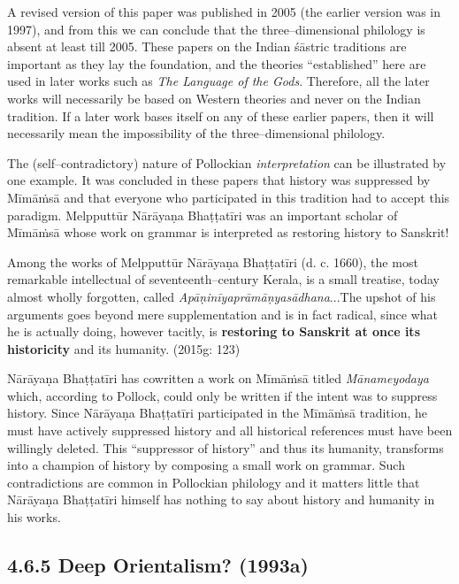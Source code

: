 A revised version of this paper was published in 2005 (the earlier version was in 1997), and from this we can conclude that the three–dimensional philology is absent at least till 2005. These papers on the Indian śāstric traditions are important as they lay the foundation, and the theories “established” here are used in later works such as \textit{The Language of the Gods}. Therefore, all the later works will necessarily be based on Western theories and never on the Indian tradition. If a later work bases itself on any of these earlier papers, then it will necessarily mean the impossibility of the three–dimensional philology.

The (self–contradictory) nature of Pollockian \textit{interpretation} can be illustrated by one example. It was concluded in these papers that history was suppressed by Mīmāṁsā and that everyone who participated in this tradition had to accept this paradigm. Melpputtūr Nārāyaṇa Bhaṭṭatīri was an important scholar of Mīmāṁsā whose work on grammar is interpreted as restoring history to Sanskrit!

\begin{myquote}
Among the works of Melpputtūr Nārāyaṇa Bhaṭṭatīri (d. c. 1660), the most remarkable intellectual of seventeenth–century Kerala, is a small treatise, today almost wholly forgotten, called \textit{Apāṇinīyaprāmāṇyasādhana}\-...The upshot of his arguments goes beyond mere supplementation and is in fact radical, since what he is actually doing, however tacitly, is \textbf{restoring to Sanskrit at once its historicity} and its humanity. (2015g: 123)
\end{myquote}

Nārāyaṇa Bhaṭṭatīri has cowritten a work on Mīmāṁsā	titled \textit{Mānameyodaya }which, according to Pollock, could only be written if the intent was to suppress history. Since Nārāyaṇa Bhaṭṭatīri participated in the Mīmāṁsā tradition, he must have actively suppressed history and all historical references must have been willingly deleted. This “suppressor of history” and thus its humanity, transforms into a champion of history by composing a small work on grammar. Such contradictions are common in Pollockian philology and it matters little that Nārāyaṇa Bhaṭṭatīri himself has nothing to say about history and humanity in his works.

\newpage

\subsection*{4.6.5 Deep Orientalism? (1993a)}

